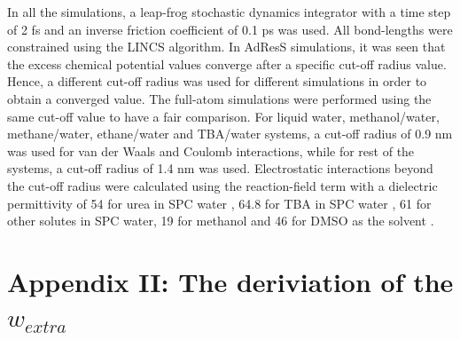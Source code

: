 \documentclass[a4paper,preprint,unsortedaddress]{revtex4-1}
\begin{document}
In all the simulations, a leap-frog stochastic dynamics integrator with a time step
of 2 fs and an inverse friction coefficient of 0.1 ps was used. All bond-lengths were constrained using the LINCS 
algorithm. In AdResS simulations, it was 
seen that the excess chemical potential values converge after a specific cut-off radius value. Hence, a different 
cut-off radius was used for different simulations in order to obtain a converged value. The full-atom simulations 
were performed using the same cut-off value to have a fair comparison. For liquid water, methanol/water, methane/water, ethane/water
and TBA/water systems, a cut-off radius of 0.9 nm was used for van der Waals and Coulomb interactions, while for rest 
of the systems, a cut-off radius of 1.4 nm was used. Electrostatic 
interactions beyond the cut-off radius were calculated using the reaction-field term \cite{rf} with a dielectric 
permittivity of 54 for urea in SPC water \cite{urea}, 64.8 for TBA in SPC water \cite{tba}, 61 for other solutes in SPC
water, 19 for methanol and 46 for DMSO as the solvent \cite{vang}. 


\section*{Appendix II: The deriviation of the $w_{extra}$}
\end{document}
